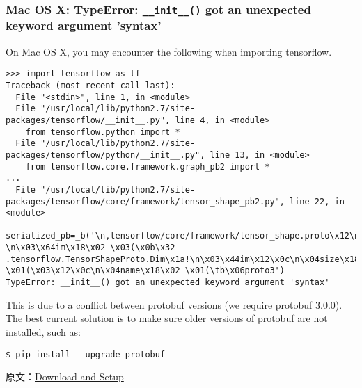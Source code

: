 \subsubsection {Mac OS X: TypeError: \lstinline{__init__()} got an unexpected keyword argument 'syntax'}

On Mac OS X, you may encounter the following when importing tensorflow.

\begin{lstlisting}
>>> import tensorflow as tf
Traceback (most recent call last):
  File "<stdin>", line 1, in <module>
  File "/usr/local/lib/python2.7/site-packages/tensorflow/__init__.py", line 4, in <module>
    from tensorflow.python import *
  File "/usr/local/lib/python2.7/site-packages/tensorflow/python/__init__.py", line 13, in <module>
    from tensorflow.core.framework.graph_pb2 import *
...
  File "/usr/local/lib/python2.7/site-packages/tensorflow/core/framework/tensor_shape_pb2.py", line 22, in <module>
    serialized_pb=_b('\n,tensorflow/core/framework/tensor_shape.proto\x12\ntensorflow\"d\n\x10TensorShapeProto\x12-\n\x03\x64im\x18\x02 \x03(\x0b\x32 .tensorflow.TensorShapeProto.Dim\x1a!\n\x03\x44im\x12\x0c\n\x04size\x18\x01 \x01(\x03\x12\x0c\n\x04name\x18\x02 \x01(\tb\x06proto3')
TypeError: __init__() got an unexpected keyword argument 'syntax'
\end{lstlisting}

This is due to a conflict between protobuf versions (we require protobuf 3.0.0). The best current solution is to make sure older versions of protobuf are not installed, such as:

\begin{lstlisting}
$ pip install --upgrade protobuf
\end{lstlisting}


原文：\href{http://tensorflow.org/get_started/os_setup.md}{Download and Setup}
